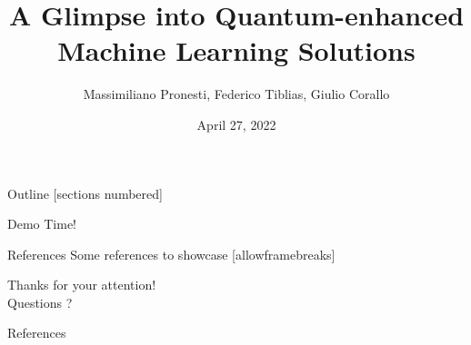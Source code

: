 \documentclass[10pt]{beamer}
\title{A Glimpse into Quantum-enhanced Machine Learning Solutions}
\date{April 27, 2022}
\author{
	Massimiliano Pronesti, 
	Federico Tiblias, 
	Giulio Corallo
}
\institute{Amadeus Knowledge Sharing Session}
\begin{document}
	
	\maketitle
	
	
	
	\begin{frame}{Outline}
		[sections numbered]
		\tableofcontents
	\end{frame}
	
	    
    
	
	
	
	\begin{frame}[standout]
		Demo Time!
	\end{frame}
	
	\begin{frame}{References}
		Some references to showcase [allowframebreaks] \cite{knuth92,ConcreteMath,Simpson,Er01,greenwade93}
	\end{frame}
	
    
	
	
	\begin{frame}[standout]
		Thanks for your attention!\\
		Questions ? ~\alert{\faSmileO}~
	\end{frame}
	
	
	\appendix
	
	\begin{frame}[allowframebreaks]{References}
		
		
	\end{frame}
	
\end{document}
